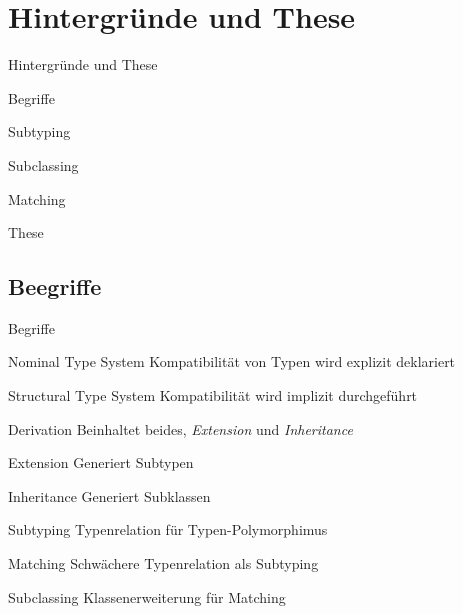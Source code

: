 \section{Hintergründe und These}
\begin{frame}{Hintergründe und These}
	\begin{bigitemize}{3mm}
		\item Begriffe
		\item Subtyping
		\item Subclassing
		\item Matching
		\item These
	\end{bigitemize}
\end{frame}

\subsection{Beegriffe}
\begin{frame}{Begriffe}
	\begin{bigdescription}{2mm}
		\item[Nominal Type System] Kompatibilität von Typen wird explizit deklariert
		\item[Structural Type System] Kompatibilität wird implizit durchgeführt
		\item[Derivation] Beinhaltet beides, \emph{Extension} und \emph{Inheritance}
		\item[Extension] Generiert Subtypen
		\item[Inheritance] Generiert Subklassen
		\item[Subtyping] Typenrelation für Typen-Polymorphimus
		\item[Matching] Schwächere Typenrelation als Subtyping
		\item[Subclassing] Klassenerweiterung für Matching
	\end{bigdescription}
\end{frame}

